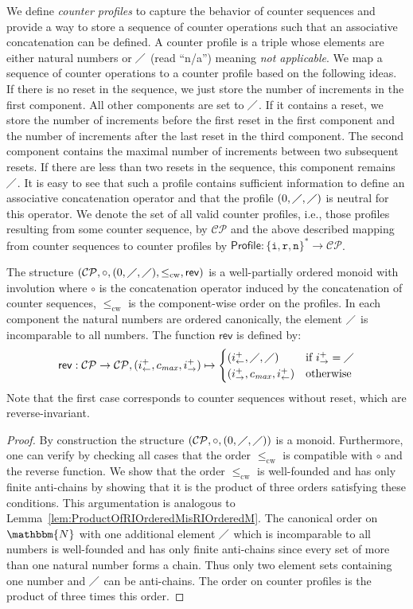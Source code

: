 \documentclass{LMCS}
\newcommand{\nat}{\mathbbm{N}}
\newcommand{\cprofile}{\mathsf{Profile}}
\newcommand{\counterProfiles}{\mathcal{CP}}
\newcommand{\cple}{\le_{\mathrm{cw}}}
\newcommand{\ipl}{i^{+}_{\leftarrow}}
\newcommand{\ipr}{i^{+}_{\rightarrow}}
\newcommand{\cmax}{c_{\mathit{max}}}
\newcommand{\na}{\diagup}
\newcommand{\rev}{\mathsf{rev}}
\newcommand{\iOp}{\ensuremath{\mathtt{i}}}
\newcommand{\rOp}{\ensuremath{\mathtt{r}}}
\newcommand{\nOp}{\ensuremath{\mathtt{n}}}
\begin{document}
We define \emph{counter profiles} to capture the behavior of counter sequences
and provide a way to store a sequence of counter operations such that an
associative concatenation can be defined. A counter profile is a triple whose
elements are either natural numbers or $\na$ (read ``n/a'') meaning \emph{not applicable}. 
We map a sequence of counter operations to a counter profile based on the following
ideas. If there is no reset in the sequence, we just store the number of
increments in the first component. All other components are set to $\na$.
If it contains a reset, we store the number of increments before the first reset 
in the first component and the number of increments after the last reset in the 
third component. The second component contains the maximal number of
increments between two subsequent resets. If there are less than two resets in
the sequence, this component remains $\na$. It is easy to see that such a
profile contains sufficient information to define an associative concatenation
operator and that the profile $(0,\na,\na)$ is neutral for this operator. We
denote the set of all valid counter profiles, i.e., those profiles resulting
from some counter sequence, by $\counterProfiles$ and the above described 
mapping from counter sequences to counter profiles by 
$\cprofile: \{\iOp,\rOp,\nOp\}^* \to \counterProfiles$.

\begin{prop}\label{prop:CounterProfilesFormAnnotationMonoid}
	The structure $(\counterProfiles,\circ,(0,\na,\na),\cple,\rev)$ is a
	well-partially ordered mon\-oid with involution where $\circ$ is the
	concatenation operator induced by the concatenation of counter sequences,
	$\cple$ is the component-wise order on the profiles. In each component the
	natural numbers are ordered canonically, the element $\na$ is incomparable
	to all numbers. The function $\rev$ is defined by:
\[
	\rev: \counterProfiles \to \counterProfiles, (\ipl,\cmax,\ipr) \mapsto
	\begin{cases} 
		(\ipl,\na,\na) & \text{if } \ipr = \na \\
		(\ipr,\cmax,\ipl) & \text{otherwise}
	\end{cases}
\]
Note that the first case corresponds to counter sequences without reset, which
are reverse-invariant.
\end{prop}
\begin{proof}
	By construction the structure $(\counterProfiles,\circ,(0,\na,\na))$ is a
monoid. Furthermore, one can verify by checking all cases that the order $\cple$
is compatible with $\circ$ and the reverse function. We show that the order
$\cple$ is well-founded and has only finite anti-chains by showing that it is
the product of three orders satisfying these conditions. This argumentation is
analogous to Lemma~\ref{lem:ProductOfRIOrderedMisRIOrderedM}. The canonical
order on $\nat$ with one additional element $\na$ which is incomparable to all
numbers is well-founded and has only finite anti-chains since every set of more
than one natural number forms a chain. Thus only two element sets containing one
number and $\na$ can be anti-chains. The order on counter profiles is the
product of three times this order.
\end{proof}
\end{document}
